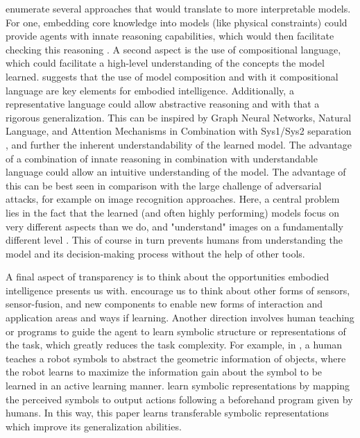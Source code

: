 \documentclass[twoside,11pt]{article}
\begin{document}
\citet{RoyEtAl:2021:RLRoboticsChallenges} enumerate several approaches that would translate to more interpretable models. For one, embedding core knowledge into models (like physical constraints) could provide agents with innate reasoning capabilities, which would then facilitate checking this reasoning \citep{HaSchmidhuber:2018:CoreKnowledgeWorldModels}. A second aspect is the use of compositional language, which could facilitate a high-level understanding of the concepts the model learned. \citet{Koditschek:2021:RoboticsCompositionalLanguage} suggests that the use of model composition and with it compositional language are key elements for embodied intelligence.
Additionally, a representative language could allow abstractive reasoning and with that a rigorous generalization. This can be inspired by Graph Neural Networks, Natural Language, and Attention Mechanisms in Combination with Sys1/Sys2 separation \citep{RoyEtAl:2021:RLRoboticsChallenges}, and further the inherent understandability of the learned model.
The advantage of a combination of innate reasoning in combination with understandable language could allow an intuitive understanding of the model. The advantage of this can be best seen in comparison with the large challenge of adversarial attacks, for example on image recognition approaches. Here, a central problem lies in the fact that the learned (and often highly performing) models focus on very different aspects than we do, and "understand" images on a fundamentally different level \citep{ChakrabortyEtAl:2021:SurveyAdversarialAttacks}. This of course in turn prevents humans from understanding the model and its decision-making process without the help of other tools.

A final aspect of transparency is to think about the opportunities embodied intelligence presents us with. \citet{RoyEtAl:2021:RLRoboticsChallenges} encourage us to think about other forms of sensors, sensor-fusion, and new components to enable new forms of interaction and application areas and ways if learning. Another direction involves human teaching \citep{kulick2013active} or programs \citep{PenkovR19,sun2019program} to guide the agent to learn symbolic structure or representations of the task, which greatly reduces the task complexity. For example, in \citep{kulick2013active}, a human teaches a robot symbols to abstract the geometric information of objects, where the robot learns to maximize the information gain about the symbol to be learned in an active learning manner. \citet{PenkovR19} learn symbolic representations by mapping the perceived symbols to output actions following a beforehand program given by humans. In this way, this paper learns transferable symbolic representations which improve its generalization abilities.
\end{document}
